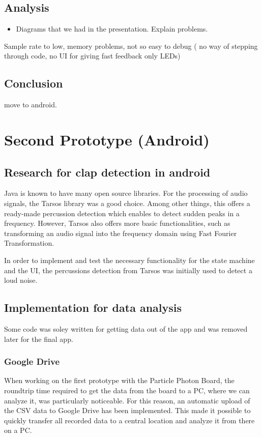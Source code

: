 \documentclass
[
 12pt, %
       DIV12,
       a4paper,
       oneside,
       titlepage,
       parskip=half,
       headings=normal,
       listof=totoc,
       bibliography=totoc,
       index=totoc,
       captions=tableheading,
       ]{scrreprt}
\begin{document}
\section{Analysis}
\label{sec:org463bcd9}
\begin{itemize}
\item Diagrams that we had in the presentation. Explain problems.
\end{itemize}

Sample rate to low, memory problems, not so easy to debug ( no way of stepping
through code, no UI for giving fast feedback only LEDs)
\section{Conclusion}
\label{sec:org01eb3ff}
move to android.



\chapter{Second Prototype (Android)}
\label{sec:orga08a9a1}

\section{Research for clap detection in android}
\label{sec:org9e5e015}
Java is known to have many open source libraries. For the processing of audio
signals, the Tarsos library was a good choice. Among other things, this offers a
ready-made percussion detection which enables to detect sudden peaks in a
frequency. However, Tarsos also offers more basic functionalities, such as
transforming an audio signal into the frequency domain using Fast Fourier
Transformation.

In order to implement and test the necessary functionality for the state machine
and the UI, the percussions detection from Tarsos was initially used to detect a
loud noise.

\section{Implementation for data analysis}
\label{sec:org56b6177}
Some code was soley written for getting data out of the app and was removed 
later for the final app.

\subsection{Google Drive}
\label{sec:orgee0256e}
When working on the first prototype with the Particle Photon Board, the
roundtrip time required to get the data from the board to a PC, where we can
analyze it, was particularly noticeable. For this reason, an automatic upload of
the CSV data to Google Drive has been implemented. This made it possible to
quickly transfer all recorded data to a central location and analyze it from
there on a PC.
\end{document}
